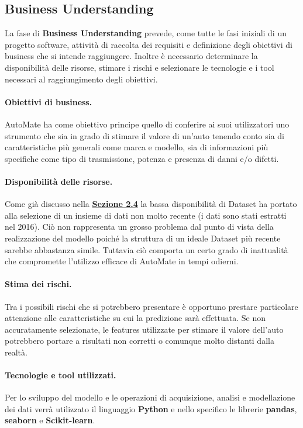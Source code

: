 \subsection{Business Understanding}
La fase di \textbf{Business Understanding} prevede, come tutte le fasi iniziali di un progetto software, attività di raccolta dei requisiti e definizione degli obiettivi di business che si intende raggiungere. Inoltre è necessario determinare la disponibilità delle risorse, stimare i rischi e selezionare le tecnologie e i tool necessari al raggiungimento degli obiettivi.

\paragraph{Obiettivi di business.}
AutoMate ha come obiettivo principe quello di conferire ai suoi utilizzatori uno strumento che sia in grado di stimare il valore di un'auto tenendo conto sia di caratteristiche più generali come marca e modello, sia di informazioni più specifiche come tipo di trasmissione, potenza e presenza di danni e/o difetti.

\paragraph{Disponibilità delle risorse.}
Come già discusso nella \hyperref[sec:problematicheDataset]{\textbf{Sezione 2.4}}
la bassa disponibilità di Dataset ha portato alla selezione di un insieme di dati non molto recente (i dati sono stati estratti nel 2016). Ciò non rappresenta un grosso problema dal punto di vista della realizzazione del modello poiché la struttura di un ideale Dataset più recente sarebbe abbastanza simile. Tuttavia ciò comporta un certo grado di inattualità che compromette l'utilizzo efficace di AutoMate in tempi odierni.

\paragraph{Stima dei rischi.}
Tra i possibili rischi che si potrebbero presentare è opportuno prestare particolare attenzione alle caratteristiche su cui la predizione sarà effettuata. Se non accuratamente selezionate, le features utilizzate per stimare il valore dell'auto potrebbero portare a risultati non corretti o comunque molto distanti dalla realtà.

\paragraph{Tecnologie e tool utilizzati.}
Per lo sviluppo del modello e le operazioni di acquisizione, analisi e modellazione dei dati verrà utilizzato il linguaggio \textbf{Python} e nello specifico le librerie \textbf{pandas}, \textbf{seaborn} e \textbf{Scikit-learn}.
\pagebreak

